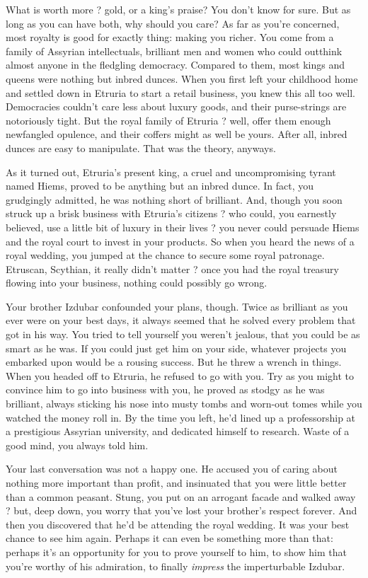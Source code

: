 \documentclass[char]{Kos}
\begin{document}
\name{\cMerchant{}}

What is worth more ? gold, or a king's praise? You don't know for sure. But as long as you can have both, why should you care? As far as you're concerned, most royalty is good for exactly thing: making you richer. You come from a family of Assyrian intellectuals, brilliant men and women who could outthink almost anyone in the fledgling democracy. Compared to them, most kings and queens were nothing but inbred dunces. When you first left your childhood home and settled down in Etruria to start a retail business, you knew this all too well. Democracies couldn't care less about luxury goods, and their purse-strings are notoriously tight. But the royal family of Etruria ? well, offer them enough newfangled opulence, and their coffers might as well be yours. After all, inbred dunces are easy to manipulate. That was the theory, anyways. 

As it turned out, Etruria's present king, a cruel and uncompromising tyrant named Hiems, proved to be anything but an inbred dunce. In fact, you grudgingly admitted, he was nothing short of brilliant. And, though you soon struck up a brisk business with Etruria's citizens ? who could, you earnestly believed, use a little bit of luxury in their lives ? you never could persuade Hiems and the royal court to invest in your products. So when you heard the news of a royal wedding, you jumped at the chance to secure some royal patronage. Etruscan, Scythian, it really didn't matter ? once you had the royal treasury flowing into your business, nothing could possibly go wrong.

Your brother Izdubar confounded your plans, though. Twice as brilliant as you ever were on your best days, it always seemed that he solved every problem that got in his way. You tried to tell yourself you weren't jealous, that you could be as smart as he was. If you could just get him on your side, whatever projects you embarked upon would be a rousing success. But he threw a wrench in things. When you headed off to Etruria, he refused to go with you. Try as you might to convince him to go into business with you, he proved as stodgy as he was brilliant, always sticking his nose into musty tombs and worn-out tomes while you watched the money roll in. By the time you left, he'd lined up a professorship at a prestigious Assyrian university, and dedicated himself to research. Waste of a good mind, you always told him.

Your last conversation was not a happy one. He accused you of caring about nothing more important than profit, and insinuated that you were little better than a common peasant. Stung, you put on an arrogant facade and walked away ? but, deep down, you worry that you've lost your brother's respect forever. And then you discovered that he'd be attending the royal wedding. It was your best chance to see him again. Perhaps it can even be something more than that: perhaps it's an opportunity for you to prove yourself to him, to show him that you're worthy of his admiration, to finally \textit{impress} the imperturbable Izdubar.
\end{document}
